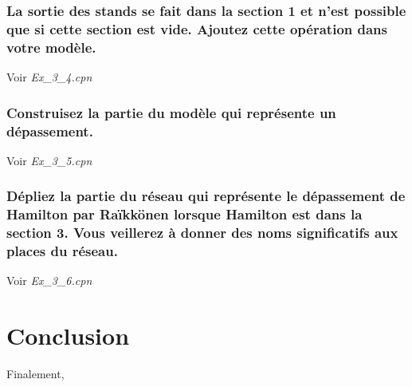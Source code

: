 \documentclass[french]{article}
\begin{document}
\subsubsection{La sortie des stands se fait dans la section 1 et n’est possible que si cette section est vide. Ajoutez cette 
opération dans votre modèle.}
Voir \textit{Ex\_3\_4.cpn} \\
\subsubsection{Construisez la partie du modèle qui 
représente un dépassement.}
Voir \textit{Ex\_3\_5.cpn} \\
\subsubsection{Dépliez la partie du réseau qui représente le dépassement de Hamilton par Raïkkönen lorsque Hamilton est dans 
la section 3. Vous veillerez à donner des noms significatifs aux places du réseau.}
Voir \textit{Ex\_3\_6.cpn} \\
\section{Conclusion}
Finalement, 
\end{document}
